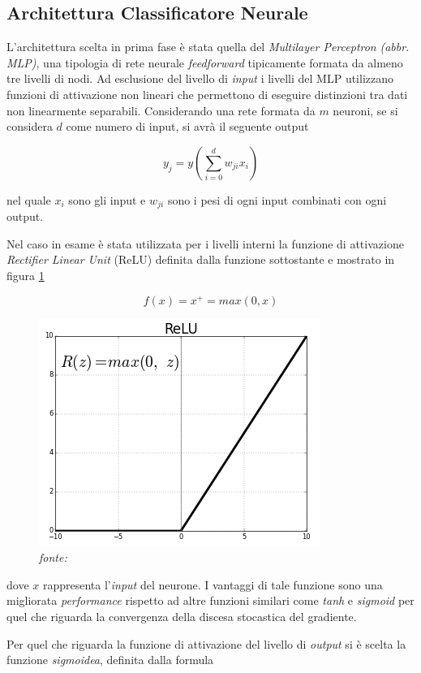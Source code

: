 \subsection{Architettura Classificatore Neurale}
\label{classificatorenninterno}
L'architettura scelta in prima fase è stata quella del \textit{Multilayer Perceptron} \textit{(abbr. MLP)}, una tipologia di rete neurale \textit{feedforward} tipicamente formata da almeno tre livelli di nodi. Ad esclusione del livello di \textit{input} i livelli del MLP utilizzano  funzioni di attivazione non lineari che permettono di eseguire distinzioni tra dati non linearmente separabili. Considerando una rete formata da $m$ neuroni,  se si considera $d$ come numero di input, si avrà il seguente output

\[y_j=y\left( \sum_{i=0}^d w_{ji}x_i \right)\]


nel quale $x_i$ sono gli input e $w_{ji}$ sono i pesi di ogni input combinati con ogni output. 


Nel caso in esame è stata utilizzata per i livelli interni la funzione di attivazione \textit{Rectifier Linear Unit} (ReLU) \cite{relu} definita dalla funzione sottostante e mostrato in figura \ref{fig:relu}

\[f(x) = x^+ = max(0,x)\]

\begin{figure}[htb]
    \centering
    \includegraphics[width=0.5\columnwidth]{figures/relu.png}
    \caption{\textit{fonte:} \cite{relufig}}
\label{fig:relu}
\end{figure}

dove $x$ rappresenta l'\textit{input} del neurone. 
I vantaggi di tale funzione sono una migliorata \textit{performance} rispetto ad altre funzioni similari come \textit{tanh} e \textit{sigmoid} per quel che riguarda la convergenza della discesa stocastica del gradiente. 

Per quel che riguarda la funzione di attivazione del livello di \textit{output} si è scelta la funzione \textit{sigmoidea}, definita dalla formula 

